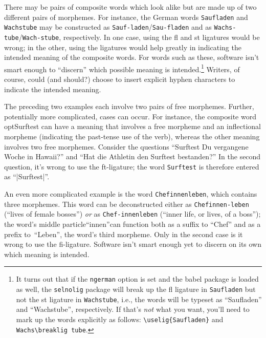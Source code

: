 \documentclass[11pt]{article}
\newcommand{\pkg}[1]{\textsf{#1}}
\newcommand{\opt}[1]{\texttt{#1}}
\begin{document}
There may be pairs of composite words which look alike but are made up of two different pairs of morphemes. For instance, the German words \opt{Saufladen} and \opt{Wachstube} may be constructed as \opt{Sauf-laden}\slash \opt{Sau-fladen} and as \opt{Wachs-tube}\slash \opt{Wach-stube}, respectively. In one case, using the fl and st ligatures would be wrong; in the other, using the ligatures would help greatly in indicating the intended meaning of the composite words. 
For words such as these, software isn't smart enough to \enquote{discern} which possible meaning is intended.\footnote{It turns out that if the \opt{ngerman} option is set and the \pkg{babel} package is loaded as well, the \opt{selnolig} package will break up the fl ligature in \opt{Saufladen} but not the st ligature in \opt{Wachstube}, i.e., the words will be typeset as \enquote{Saufladen} and \enquote{Wachstube}, respectively. If that's \emph{not} what you want, you'll need to mark up the words explicitly as follows: \Verb+\uselig{Saufladen}+ and \Verb+Wachs\breaklig tube+.} 
Writers, of course, could (and should?) choose to insert explicit hyphen characters to indicate the intended meaning.

The preceding two examples each involve two pairs of free morphemes. Further, potentially more complicated, cases can occur. For instance, the composite word opt{Surftest} can have a meaning that involves a free morpheme and an inflectional morpheme (indicating the past-tense use of the verb), whereas the other meaning involves two free morphemes. Consider the questions \enquote{Surftest Du vergangene Woche in Hawaii?} and \enquote{Hat die Athletin den Surf\breaklig test bestanden?} In the second question, it's wrong to use the ft-ligature; the word \opt{Surftest} is therefore entered as ``|Surf\breaklig test|''.

An even more complicated example is the word \opt{Chefinnenleben}, which contains three morphemes. This word can be deconstructed either as \opt{Chefinnen-leben} (\enquote{lives of female bosses}) \emph{or} as \opt{Chef-innenleben} (\enquote{inner life, or lives, of a boss}); the word's middle particle\textemdash\enquote{innen}\textemdash can function both as a suffix to \enquote{Chef} and as a prefix to~\enquote{Leben}, the word's third morpheme. Only in the second case is it wrong to use the fi-ligature. Software isn't smart enough yet to discern on its own which meaning is intended.
\end{document}
